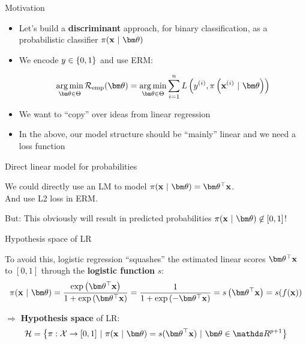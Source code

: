 \documentclass[11pt,compress,t,notes=noshow, xcolor=table]{beamer}
\begin{document}

\begin{vbframe}{Motivation}

\begin{itemize}

\item Let's build a \textbf{discriminant} approach, for binary classification, as a probabilistic classifier $\pixt$

\item We encode $y \in \{0, 1\}$ and use ERM:
  
$$ 
\argmin_{\thetav \in \Theta} \risket = \argmin_{\thetav \in \Theta} \sumin \Lpixyit
$$

\item We want to \enquote{copy} over ideas from linear regression

\item In the above, our model structure should be \enquote{mainly} linear and we need a loss function

\end{itemize}


\end{vbframe}

\begin{vbframe}{Direct linear model for probabilities}

We could directly use an LM to model $\pixt = \thx$.\\
And use L2 loss in ERM.

\lz 


But: This obviously will result in predicted probabilities $\pixt \not\in [0,1]$!

\end{vbframe}

\begin{vbframe}{Hypothesis space of LR}

To avoid this, logistic regression \enquote{squashes} the estimated linear scores $\thx$ to $[0,1]$ through the \textbf{logistic function} $s$:
$$
\pixt = \frac{\exp\left( \thx \right)}{1+\exp\left(\thx \right)} = \frac{1}{1+\exp\left( -\thx \right)} = s\left( \thx \right) = s(\fx)
$$


$\Rightarrow$ \textbf{Hypothesis space} of LR:
$$
  \Hspace = \left\{\pi: \Xspace \to [0,1] ~|~\pixt = s(\thx) ~|~ \thetav \in \R^{p+1} \right\}
$$

\end{vbframe}
\end{document}
